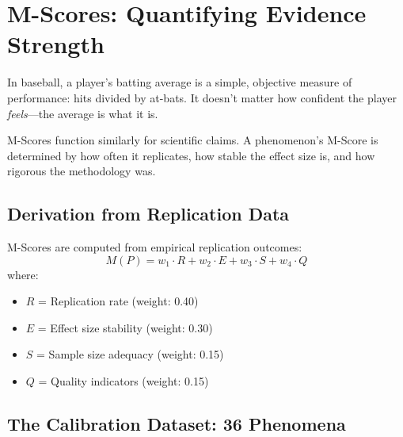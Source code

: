 \documentclass[11pt,a4paper]{article}
\begin{document}

\section{M-Scores: Quantifying Evidence Strength}

\begin{analogybox}
In baseball, a player's batting average is a simple, objective measure of performance: hits divided by at-bats. It doesn't matter how confident the player \emph{feels}---the average is what it is.

M-Scores function similarly for scientific claims. A phenomenon's M-Score is determined by how often it replicates, how stable the effect size is, and how rigorous the methodology was.
\end{analogybox}


\subsection{Derivation from Replication Data}

M-Scores are computed from empirical replication outcomes:
\begin{equation}
M(P) = w_1 \cdot R + w_2 \cdot E + w_3 \cdot S + w_4 \cdot Q
\end{equation}
where:
\begin{itemize}
    \item $R$ = Replication rate (weight: 0.40)
    \item $E$ = Effect size stability (weight: 0.30)
    \item $S$ = Sample size adequacy (weight: 0.15)
    \item $Q$ = Quality indicators (weight: 0.15)
\end{itemize}


\subsection{The Calibration Dataset: 36 Phenomena}
\end{document}
